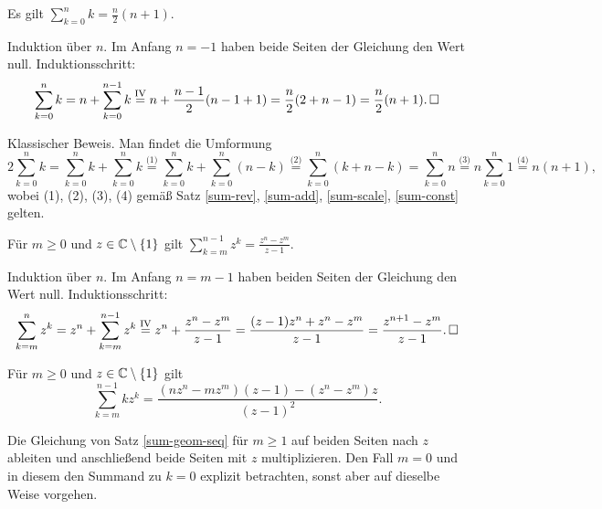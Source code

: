 \begin{Satz}%
\newlinefirst
Es gilt $\displaystyle\sum_{k=0}^n k = \frac{n}{2}(n+1)$.
\end{Satz}
\begin{Beweis}[Beweis 1]
Induktion über $n$. Im Anfang $n=-1$ haben beide Seiten der Gleichung
den Wert null. Induktionsschritt:
\[\sum_{k=0}^n k = n + \sum_{k=0}^{n-1} k
\stackrel{\mathrm{IV}}= n + \frac{n-1}{2}(n-1+1)
= \frac{n}{2}(2 + n-1) = \frac{n}{2}(n+1).\,\square\]
\end{Beweis}
\begin{Beweis}[Beweis 2]
Klassischer Beweis. Man findet die Umformung
\[2\!\sum_{k=0}^n k = \!\sum_{k=0}^n k + \!\sum_{k=0}^n k
\stackrel{\text{(1)}}= \!\sum_{k=0}^n k + \!\sum_{k=0}^n (n-k)
\stackrel{\text{(2)}}= \!\sum_{k=0}^n (k+n-k)
= \!\sum_{k=0}^n n \stackrel{\text{(3)}}= n\!\sum_{k=0}^n 1
\stackrel{\text{(4)}}= n(n+1),\]
wobei (1), (2), (3), (4) gemäß Satz
\ref{sum-rev}, \ref{sum-add}, \ref{sum-scale}, \ref{sum-const}
gelten.\,\qedsymbol
\end{Beweis}

\begin{Satz}%
\label{sum-geom-seq}\newlinefirst
Für $m\ge 0$ und $z\in\mathbb C\setminus\{1\}$ gilt
$\displaystyle\sum_{k=m}^{n-1} z^k = \frac{z^n-z^m}{z-1}$.
\end{Satz}
\begin{Beweis}
Induktion über $n$. Im Anfang $n=m-1$ haben beiden Seiten der Gleichung
den Wert null. Induktionsschritt:
\[\sum_{k=m}^n z^k = z^n + \sum_{k=m}^{n-1} z^k
\stackrel{\mathrm{IV}}= z^n + \frac{z^n-z^m}{z-1}
= \frac{(z-1)z^n+z^n-z^m}{z-1}
= \frac{z^{n+1}-z^m}{z-1}.\,\square\]
\end{Beweis}

\begin{Satz}
Für $m\ge 0$ und $z\in\mathbb C\setminus\{1\}$ gilt
\[\sum_{k=m}^{n-1} kz^k
= \frac{(nz^n-mz^m)(z-1) - (z^n-z^m)z}{(z-1)^2}.\]
\end{Satz}
\begin{Beweis}
Die Gleichung von Satz \ref{sum-geom-seq} für $m\ge 1$ auf beiden
Seiten nach $z$ ableiten und anschließend beide Seiten mit $z$
multiplizieren. Den Fall $m=0$ und in diesem den Summand zu $k=0$
explizit betrachten, sonst aber auf dieselbe Weise vorgehen.\,\qedsymbol
\end{Beweis}

